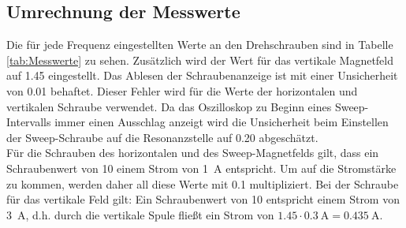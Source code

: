 \subsection{Umrechnung der Messwerte}
Die für jede Frequenz eingestellten Werte an den Drehschrauben sind in Tabelle \ref{tab:Messwerte} zu sehen. Zusätzlich wird der Wert für das vertikale Magnetfeld auf 1.45 eingestellt.
Das Ablesen der Schraubenanzeige ist mit einer Unsicherheit von 0.01 behaftet. Dieser Fehler wird für die Werte der horizontalen und vertikalen Schraube verwendet. Da das Oszilloskop zu Beginn eines Sweep-Intervalls immer einen Ausschlag anzeigt wird die Unsicherheit beim Einstellen der Sweep-Schraube auf die Resonanzstelle auf 0.20 abgeschätzt. \\
Für die Schrauben des horizontalen und des Sweep-Magnetfelds gilt, dass ein Schraubenwert von 10 einem Strom von \SI{1}{\ampere} entspricht. Um auf die Stromstärke zu kommen, werden daher all diese Werte mit 0.1 multipliziert. Bei der Schraube für das vertikale Feld gilt: Ein Schraubenwert von 10 entspricht einem Strom von \SI{3}{\ampere}, d.h. durch die vertikale Spule fließt ein Strom von $1.45\cdot \SI{0.3}{\ampere} = \SI{0.435}{\ampere}$.
 \\
